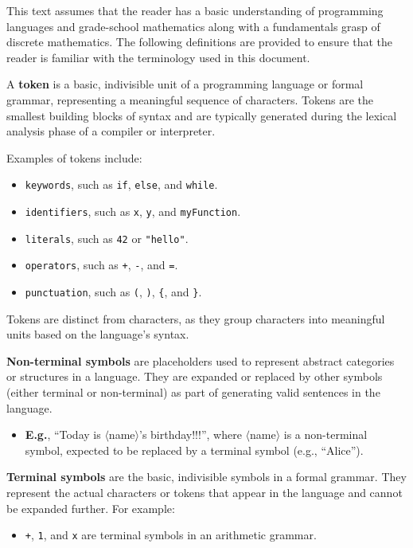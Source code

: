 This text assumes that the reader has a basic understanding of programming languages and grade-school mathematics along
with a fundamentals grasp of discrete mathematics. The following definitions are provided to ensure that the reader is familiar with
the terminology used in this document.
\begin{Def}[Token]

    A \textbf{token} is a basic, indivisible unit of a programming language or formal grammar, representing 
    a meaningful sequence of characters. Tokens are the smallest building blocks of syntax and are typically 
    generated during the lexical analysis phase of a compiler or interpreter.

    \vspace{1em}
    \noindent
    Examples of tokens include:
    \begin{itemize}
        \item \texttt{keywords}, such as \texttt{if}, \texttt{else}, and \texttt{while}.
        \item \texttt{identifiers}, such as \texttt{x}, \texttt{y}, and \texttt{myFunction}.
        \item \texttt{literals}, such as \texttt{42} or \texttt{"hello"}.
        \item \texttt{operators}, such as \texttt{+}, \texttt{-}, and \texttt{=}.
        \item \texttt{punctuation}, such as \texttt{(}, \texttt{)}, \texttt{\{}, and \texttt{\}}.
    \end{itemize}

    \vspace{1em}
    Tokens are distinct from characters, as they group characters into meaningful units based on the language's syntax.
\end{Def}

\begin{Def}
    
    \textbf{Non-terminal symbols} are placeholders used to represent abstract categories or structures in a language. 
    They are expanded or replaced by other symbols (either terminal or non-terminal) as part of generating valid sentences 
    in the language.
    \begin{itemize}
    \item \textbf{E.g.}, ``Today is $\langle$name$\rangle$'s birthday!!!'', where $\langle$name$\rangle$ is a non-terminal symbol, 
    expected to be replaced by a terminal symbol (e.g., ``Alice''). 
    \end{itemize}

    \noindent
    \textbf{Terminal symbols} are the basic, indivisible symbols in a formal grammar. They represent the actual characters 
    or tokens that appear in the language and cannot be expanded further. For example:
    \begin{itemize}
        \item \texttt{+}, \texttt{1}, and \texttt{x} are terminal symbols in an arithmetic grammar.
    \end{itemize}
\end{Def}

